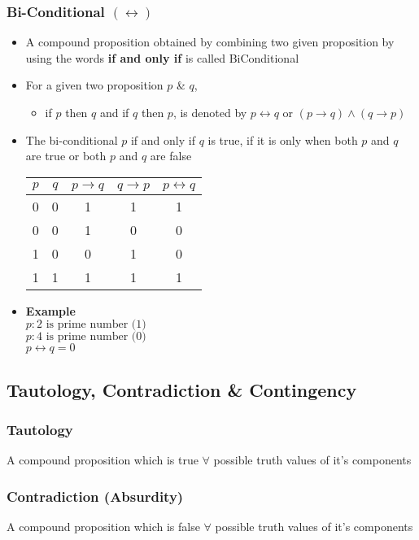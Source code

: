 \documentclass{article}
\begin{document}
	\subsubsection{Bi-Conditional $(\leftrightarrow)$}
	\begin{itemize}
		\item A compound proposition obtained by combining two given proposition by using the words
			\textbf{if and only if} is called BiConditional
		\item For a given two proposition $p$ \& $q$,
			\begin{itemize}
				\item if $p$ then $q$ and if $q$ then $p$, is denoted by $p\leftrightarrow q$
					or $(p\to q)\land(q\to p)$
			\end{itemize}
		\item The bi-conditional $p$ if and only if $q$ is true, if it is only when both $p$ and $q$
			are true or both $p$ and $q$ are false
			\begin{center}
				\begin{tabular}{|c|c|c|c|c|} \hline
					$p$ & $q$ & $p\to q$ & $q\to p$ & $p\leftrightarrow q$ \\ \hline
					0 & 0 & 1 & 1 & 1 \\
					0 & 0 & 1 & 0 & 0 \\
					1 & 0 & 0 & 1 & 0 \\
					1 & 1 & 1 & 1 & 1 \\ \hline
				\end{tabular}
			\end{center}
		\item [] \textbf{Example} \\
			$p : \text{2 is prime number (1)}$ \\
			$p : \text{4 is prime number (0)}$ \\
			$p\leftrightarrow q=0$
	\end{itemize}

	\subsection{Tautology, Contradiction \& Contingency}
	\subsubsection{Tautology}
	A compound proposition which is true $\forall$ possible truth values of it's components

	\subsubsection{Contradiction (Absurdity)}
	A compound proposition which is false $\forall$ possible truth values of it's components
\end{document}
